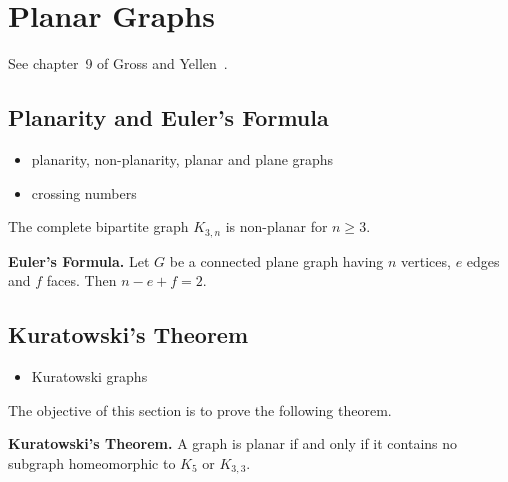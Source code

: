 
\chapter{Planar Graphs}
\label{chap:planar_graphs}

See chapter~9 of Gross and Yellen~\cite{GrossYellen1999}.



\section{Planarity and Euler's Formula}

\begin{itemize}
\item planarity, non-planarity, planar and plane graphs

\item crossing numbers
\end{itemize}

\begin{theorem}
The complete bipartite graph $K_{3,n}$ is non-planar for $n \geq 3$.
\end{theorem}

\begin{theorem}
\textbf{Euler's Formula.}
Let $G$ be a connected plane graph having $n$ vertices, $e$ edges and
$f$ faces. Then $n - e + f = 2$.
\end{theorem}



\section{Kuratowski's Theorem}

\begin{itemize}
\item Kuratowski graphs
\end{itemize}

The objective of this section is to prove the following theorem.

\begin{theorem}
\textbf{Kuratowski's Theorem.}
A graph is planar if and only if it contains no subgraph homeomorphic
to $K_5$ or $K_{3,3}$.
\end{theorem}


